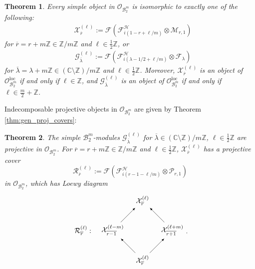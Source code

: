 \documentclass[11pt, reqno]{amsart}
\newtheorem{thm}{Theorem}[section]
\theoremstyle{definition}\newtheorem{defi}[thm]{Definition}
\theoremstyle{definition}\newtheorem{rem}[thm]{Remark}
\theoremstyle{definition}\newtheorem{exam}[thm]{Example}
\theoremstyle{definition}\newtheorem{assum}[thm]{Assumption}
\newcommand{\cB}{\mathcal{B}}
\newcommand{\cH}{\mathcal{H}}
\newcommand{\cM}{\mathcal{M}}
\newcommand{\cX}{\mathcal{X}}
\newcommand{\cF}{\mathcal{F}}
\newcommand{\cO}{\mathcal{O}}
\newcommand{\cP}{\mathcal{P}}
\newcommand{\cG}{\mathcal{G}}
\newcommand{\CC}{\mathbb{C}}
\newcommand{\ZZ}{\mathbb{Z}}
\newcommand{\Oloc}{\cO^{\mathrm{loc}}}
\begin{document}
\begin{thm}\label{thm:B2m_simple_objects}
Every simple object in $\cO_{\cB_2^m}$ is isomorphic to exactly one of the following:
 \begin{align*}
&  \cX_{\overline{r}}^{(\ell)} :=\cF\left(\cF^\cH_{i(1-r +\ell/m)}\otimes\cM_{r,1}\right)
\end{align*}
for $\overline{r} = r + m\ZZ \in \ZZ/m\ZZ$ and $\ell\in\frac{1}{2}\ZZ$, or
\begin{align*}
& \cG_{\overline{\lambda}}^{(\ell)}:=\cF\left(\cF^{\cH}_{i(\lambda-1/2+\ell/m)}\otimes\cF_{\lambda}\right)
 \end{align*}
 for $\overline{\lambda}=\lambda+m\ZZ\in(\CC\setminus \ZZ)/m\ZZ$ and $\ell\in\frac{1}{2}\ZZ$. Moreover, $\cX_{\overline{r}}^{(\ell)}$ is an object of $\Oloc_{\cB_2^m}$ if and only if $\ell\in\ZZ$, and $\cG_{\overline{\lambda}}^{(\ell)}$ is an object of $\Oloc_{\cB_2^m}$ if and only if $\ell\in\frac{m}{2}+\ZZ$.
\end{thm}

Indecomposable projective objects in $\cO_{\cB_2^m}$ are given by Theorem \ref{thm:gen_proj_covers}:
\begin{thm}\label{thm:B2m_proj_modules}
The simple $\cB_2^m$-modules $\cG^{(\ell)}_{\overline{\lambda}}$ for $\overline{\lambda}\in(\CC\setminus\ZZ)/m\ZZ$, $\ell\in\frac{1}{2}\ZZ$ are projective in $\cO_{\cB_2^m}$. For $\overline{r}=r+m\ZZ\in\ZZ/m\ZZ$ and $\ell\in\frac{1}{2}\ZZ$, $\cX_{\overline{r}}^{(\ell)}$ has a projective cover
\begin{equation*}
\mathcal{R}_{\overline{r}}^{(\ell)}:=\cF\left(\cF^\cH_{i(r-1-\ell/m)}\otimes\cP_{r,1}\right)
\end{equation*}
in $\cO_{\cB_2^m}$, which has Loewy diagram
\begin{equation}\label{eqn:Qsl_Loewy_diag:orbifold2}
 \begin{matrix}
  \begin{tikzpicture}[->,>=latex,scale=1.5]
\node (b1) at (1,0) {$\cX_{\overline{r}}^{(\ell)}$};
\node (c1) at (-1, 1){$\mathcal{R}_{\overline{r}}^{(\ell)}:$};
   \node (a1) at (0,1) {$\cX_{\overline{r-1}}^{(\ell-m)}$};
   \node (b2) at (2,1) {$\cX_{\overline{r+1}}^{(\ell+m)}$};
    \node (a2) at (1,2) {$\cX_{\overline{r}}^{(\ell)}$};
\draw[] (b1) -- node[left] {} (a1);
   \draw[] (b1) -- node[left] {} (b2);
    \draw[] (a1) -- node[left] {} (a2);
    \draw[] (b2) -- node[left] {} (a2);
\end{tikzpicture}
\end{matrix} .
 \end{equation}
\end{thm}
\end{document}
